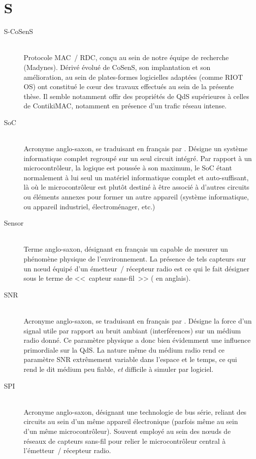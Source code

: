
\section*{S}

\begin{description}

\item[S-CoSenS] \ \\
Protocole MAC~/ RDC, conçu au sein de notre équipe de recherche (Madynes).
Dérivé évolué de CoSenS, son implantation et son amélioration, au sein
de plates-formes logicielles adaptées (comme RIOT OS) ont constitué le
c{\oe}ur des travaux effectués au sein de la présente thèse. Il semble
notamment offir des propriétés de QdS supérieures à celles de ContikiMAC,
notamment en présence d'un trafic réseau intense.

\item[SoC]  \\
Acronyme anglo-saxon, se traduisant en français par . Désigne un système informatique complet regroupé sur un
seul circuit intégré. Par rapport à un microcontrôleur, la logique est
poussée à son maximum, le SoC étant normalement à lui seul un matériel
informatique complet et auto-suffisant, là où le microcontrôleur est plutôt
destiné à être associé à d'autres circuits ou éléments annexes pour former
un autre appareil (système informatique, ou appareil industriel,
électroménager, etc.)

\item[Sensor] \ \\
Terme anglo-saxon, désignant en français un  capable de mesurer
un phénomène physique de l'environnement. La présence de tels capteurs sur
un n{\oe}ud équipé d'un émetteur~/ récepteur radio est ce qui le fait
désigner sous le terme de <<~capteur sans-fil~>> ( en anglais).

\item[SNR]  \\
Acronyme anglo-saxon, se traduisant en français par . Désigne la force d'un signal utile par rapport au bruit
ambiant (interférences) sur un médium radio donné. Ce paramètre physique
a donc bien évidemment une influence primordiale sur la QdS. La nature
même du médium radio rend ce paramètre SNR extrêmement variable dans
l'espace et le temps, ce qui rend le dit médium peu fiable, \emph{et}
difficile à simuler par logiciel.

\item[SPI]  \\
Acronyme anglo-saxon, désignant une technologie de bus série, reliant des
circuits au sein d'un même appareil électronique (parfois même au sein
d'un même microcontrôleur). Souvent employé au sein des n{\oe}uds de
réseaux de capteurs sans-fil pour relier le microcontrôleur central
à l'émetteur~/ récepteur radio.

\end{description}

